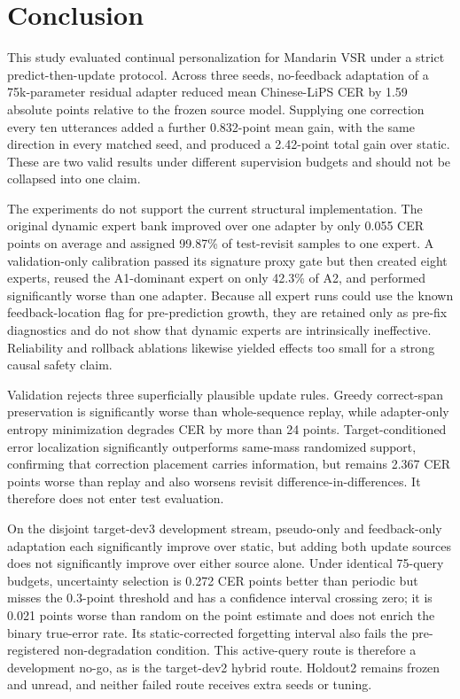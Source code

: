 \section{Conclusion}
\label{sec:conclusion}

This study evaluated continual personalization for Mandarin VSR under a strict predict-then-update protocol. Across three seeds, no-feedback adaptation of a 75k-parameter residual adapter reduced mean Chinese-LiPS CER by 1.59 absolute points relative to the frozen source model. Supplying one correction every ten utterances added a further 0.832-point mean gain, with the same direction in every matched seed, and produced a 2.42-point total gain over static. These are two valid results under different supervision budgets and should not be collapsed into one claim.

The experiments do not support the current structural implementation. The original dynamic expert bank improved over one adapter by only 0.055 CER points on average and assigned 99.87\% of test-revisit samples to one expert. A validation-only calibration passed its signature proxy gate but then created eight experts, reused the A1-dominant expert on only 42.3\% of A2, and performed significantly worse than one adapter. Because all expert runs could use the known feedback-location flag for pre-prediction growth, they are retained only as pre-fix diagnostics and do not show that dynamic experts are intrinsically ineffective. Reliability and rollback ablations likewise yielded effects too small for a strong causal safety claim.

Validation rejects three superficially plausible update rules. Greedy correct-span preservation is significantly worse than whole-sequence replay, while adapter-only entropy minimization degrades CER by more than 24 points. Target-conditioned error localization significantly outperforms same-mass randomized support, confirming that correction placement carries information, but remains 2.367 CER points worse than replay and also worsens revisit difference-in-differences. It therefore does not enter test evaluation.

On the disjoint target-dev3 development stream, pseudo-only and feedback-only adaptation each significantly improve over static, but adding both update sources does not significantly improve over either source alone. Under identical 75-query budgets, uncertainty selection is 0.272 CER points better than periodic but misses the 0.3-point threshold and has a confidence interval crossing zero; it is 0.021 points worse than random on the point estimate and does not enrich the binary true-error rate. Its static-corrected forgetting interval also fails the pre-registered non-degradation condition. This active-query route is therefore a development no-go, as is the target-dev2 hybrid route. Holdout2 remains frozen and unread, and neither failed route receives extra seeds or tuning.

